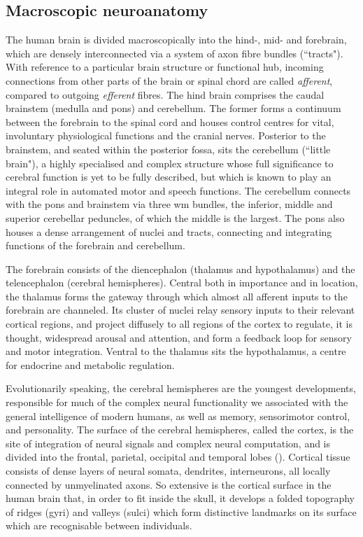\subsection{Macroscopic neuroanatomy}

The human brain is divided macroscopically into the hind-, mid- and forebrain, which are densely interconnected via a system of axon fibre bundles (``tracts").
With reference to a particular brain structure or functional hub, incoming connections from other parts of the brain or spinal chord are called \textit{afferent}, compared to outgoing \textit{efferent} fibres.
The hind brain comprises the caudal brainstem (medulla and pons) and cerebellum.
The former forms a continuum between the forebrain to the spinal cord and houses control centres for vital, involuntary physiological functions and the cranial nerves.
Posterior to the brainstem, and seated within the posterior fossa, sits the cerebellum (``little brain"),
a highly specialised and complex structure whose full significance to cerebral function is yet to be fully described, but which is known to play an integral role in automated motor and speech functions.
The cerebellum connects with the pons and brainstem via three \gls{wm} bundles, the inferior, middle and superior cerebellar peduncles, of which the middle is the largest.
The pons also houses a dense arrangement of nuclei and tracts, connecting and integrating functions of the forebrain and cerebellum.

The forebrain consists of the diencephalon (thalamus and hypothalamus) and the telencephalon (cerebral hemispheres).
Central both in importance and in location, the thalamus forms the gateway through which almost all afferent inputs to the forebrain are channeled.
Its cluster of nuclei relay sensory inputs to their relevant cortical regions, and project diffusely to all regions of the cortex to regulate, it is thought, widespread arousal and attention, and form a feedback loop for sensory and motor integration.
Ventral to the thalamus sits the hypothalamus, a centre for endocrine and metabolic regulation.

Evolutionarily speaking, the cerebral hemispheres are the youngest developments, responsible for much of the complex neural functionality we associated with the general intelligence of modern humans, as well as memory, sensorimotor control, and personality.
The surface of the cerebral hemispheres, called the cortex, is the site of integration of neural signals and complex neural computation, and is divided into the frontal, parietal, occipital and temporal lobes ().
Cortical tissue consists of dense layers of neural somata, dendrites, interneurons, all locally connected by unmyelinated axons.
So extensive is the cortical surface in the human brain that, in order to fit inside the skull, it develops a folded topography of ridges (gyri) and valleys (sulci) which form distinctive landmarks on its surface which are recognisable between individuals.


